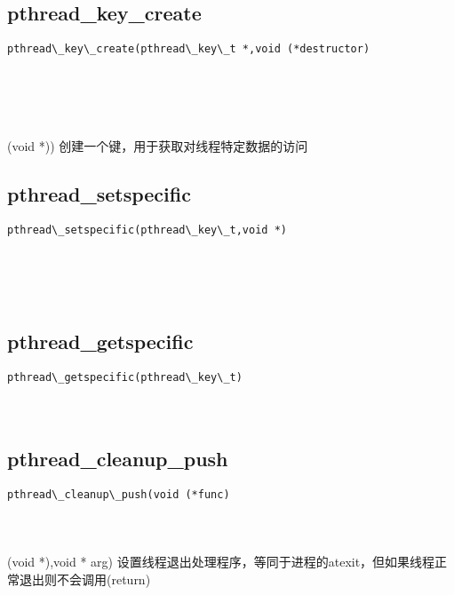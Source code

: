\documentclass[10pt,a4paper]{article}
\begin{document}
\subsection{pthread\_key\_create}
\begin{spacing}{2.0}
\lstset{language=C,numbers=none}
\begin{lstlisting}
pthread\_key\_create(pthread\_key\_t *,void (*destructor)
\end{lstlisting}
{\large\color[rgb]{0.2,0.4,0.6}{*:}} \\
{\large\color[rgb]{0.2,0.4,0.6}{(*destructor:}}
\paragraph{ \ \ }(void *)) 创建一个键，用于获取对线程特定数据的访问
\end{spacing}

\subsection{pthread\_setspecific}
\begin{spacing}{2.0}
\lstset{language=C,numbers=none}
\begin{lstlisting}
pthread\_setspecific(pthread\_key\_t,void *)
\end{lstlisting}
{\large\color[rgb]{0.2,0.4,0.6}{pthread\_key\_t:}} \\
{\large\color[rgb]{0.2,0.4,0.6}{*:}}
\paragraph{ \ \ }
\end{spacing}

\subsection{pthread\_getspecific}
\begin{spacing}{2.0}
\lstset{language=C,numbers=none}
\begin{lstlisting}
pthread\_getspecific(pthread\_key\_t)
\end{lstlisting}
{\large\color[rgb]{0.2,0.4,0.6}{pthread\_key\_t:}}
\paragraph{ \ \ }
\end{spacing}

\subsection{pthread\_cleanup\_push}
\begin{spacing}{2.0}
\lstset{language=C,numbers=none}
\begin{lstlisting}
pthread\_cleanup\_push(void (*func)
\end{lstlisting}
{\large\color[rgb]{0.2,0.4,0.6}{(*func:}}
\paragraph{ \ \ }(void *),void * arg) 设置线程退出处理程序，等同于进程的atexit，但如果线程正常退出则不会调用(return)
\end{spacing}
\end{document}
